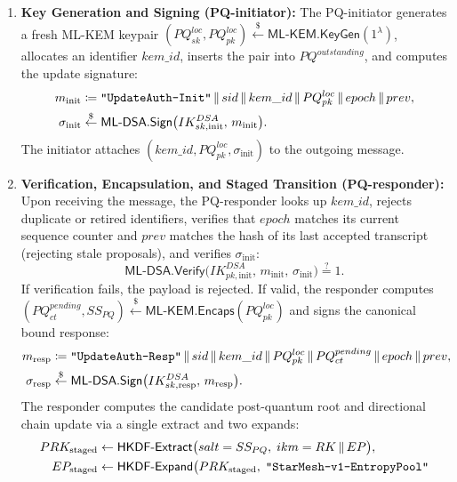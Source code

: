 \documentclass[11pt,a4paper]{article}
\theoremstyle{remark}
\theoremstyle{plain}
\newcommand{\getsr}{\stackrel{\$}{\leftarrow}}
\newcommand{\MLKEM}{\mathsf{ML\text{-}KEM}}
\newcommand{\MLDSA}{\mathsf{ML\text{-}DSA}}
\newcommand{\HKDFExtract}{\mathsf{HKDF\text{-}Extract}}
\newcommand{\HKDFExpand}{\mathsf{HKDF\text{-}Expand}}
\newcommand{\Encaps}{\mathsf{Encaps}}
\newcommand{\Sign}{\mathsf{Sign}}
\newcommand{\Verify}{\mathsf{Verify}}
\newcommand{\KeyGen}{\mathsf{KeyGen}}
\newcommand{\strlit}[1]{\text{\upshape\texttt{"#1"}}}
\begin{document}
\begin{enumerate}
  \item \textbf{Key Generation and Signing (PQ-initiator):} The PQ-initiator generates a fresh ML-KEM keypair
        $(PQ^{loc}_{sk}, PQ^{loc}_{pk}) \getsr \MLKEM.\KeyGen(1^\lambda)$, allocates an
        identifier $kem\_id$, inserts the pair into $PQ^{outstanding}$, and computes the update signature:
        \begin{align*}
          m_{\mathrm{init}} &\coloneqq \strlit{UpdateAuth-Init} \,\|\, sid \,\|\, kem\_id \,\|\, PQ^{loc}_{pk} \,\|\, epoch \,\|\, prev, \\
          \sigma_{\mathrm{init}} &\getsr \MLDSA.\Sign\bigl(IK^{DSA}_{sk,\mathrm{init}},\, m_{\mathrm{init}}\bigr).
        \end{align*}
        The initiator attaches $(kem\_id, PQ^{loc}_{pk}, \sigma_{\mathrm{init}})$ to the outgoing message.
  \item \textbf{Verification, Encapsulation, and Staged Transition (PQ-responder):}
      Upon receiving the message, the PQ-responder looks up $kem\_id$, rejects duplicate or retired
      identifiers, verifies that $epoch$ matches its current sequence counter and $prev$ matches
      the hash of its last accepted transcript (rejecting stale proposals), and verifies $\sigma_{\mathrm{init}}$:
      \[
        \MLDSA.\Verify\bigl(IK^{DSA}_{pk,\mathrm{init}},\, m_{\mathrm{init}},\, \sigma_{\mathrm{init}}\bigr) \stackrel{?}{=} 1.
      \]
      If verification fails, the payload is rejected.  If valid, the responder computes
      $(PQ^{pending}_{ct}, SS_{PQ}) \getsr \MLKEM.\Encaps(PQ^{loc}_{pk})$ and signs the canonical bound response:
      \begin{align*}
        m_{\mathrm{resp}} &\coloneqq \strlit{UpdateAuth-Resp} \,\|\, sid \,\|\, kem\_id \,\|\, PQ^{loc}_{pk} \,\|\, PQ^{pending}_{ct} \,\|\, epoch \,\|\, prev, \\
        \sigma_{\mathrm{resp}} &\getsr \MLDSA.\Sign\bigl(IK^{DSA}_{sk,\mathrm{resp}},\, m_{\mathrm{resp}}\bigr).
      \end{align*}
      The responder computes the candidate post-quantum root and directional chain update via a single extract and two expands:
      \begin{align*}
        PRK_{\mathrm{staged}} &\gets \HKDFExtract\bigl(salt = SS_{PQ},\; ikm = RK \,\|\, EP\bigr), \\
        EP_{\mathrm{staged}} &\gets \HKDFExpand\bigl(PRK_{\mathrm{staged}},\; \strlit{StarMesh-v1-EntropyPool} \\

\end{align*}
\end{enumerate}
\end{document}
